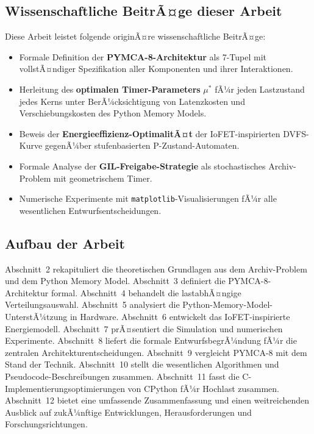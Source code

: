 ﻿\documentclass[a4paper,12pt]{scrreprt}
\theoremstyle{definition}
\begin{document}
	\subsection{Wissenschaftliche BeitrÃ¤ge dieser Arbeit}
	
	Diese Arbeit leistet folgende originÃ¤re wissenschaftliche BeitrÃ¤ge:
	
	\begin{itemize}[noitemsep]
		\item Formale Definition der \textbf{PYMCA-8-Architektur} als
		7-Tupel mit vollstÃ¤ndiger Spezifikation aller Komponenten und
		ihrer Interaktionen.
		\item Herleitung des \textbf{optimalen Timer-Parameters} $\mu^*$ fÃ¼r
		jeden Lastzustand jedes Kerns unter BerÃ¼cksichtigung von
		Latenzkosten und Verschiebungskosten des Python Memory Models.
		\item Beweis der \textbf{Energieeffizienz-OptimalitÃ¤t} der IoFET-inspirierten
		DVFS-Kurve gegenÃ¼ber stufenbasierten P-Zustand-Automaten.
		\item Formale Analyse der \textbf{GIL-Freigabe-Strategie} als
		stochastisches Archiv-Problem mit geometrischem Timer.
		\item Numerische Experimente mit \texttt{matplotlib}-Visualisierungen
		fÃ¼r alle wesentlichen Entwurfsentscheidungen.
	\end{itemize}
	
	\subsection{Aufbau der Arbeit}

	Abschnitt~2 rekapituliert die theoretischen Grundlagen aus dem Archiv-Problem und dem Python Memory Model.
	Abschnitt~3 definiert die PYMCA-8-Architektur formal.
	Abschnitt~4 behandelt die lastabhÃ¤ngige Verteilungsauswahl.
	Abschnitt~5 analysiert die Python-Memory-Model-UnterstÃ¼tzung in Hardware.
	Abschnitt~6 entwickelt das IoFET-inspirierte Energiemodell.
	Abschnitt~7 prÃ¤sentiert die Simulation und numerischen Experimente.
	Abschnitt~8 liefert die formale EntwurfsbegrÃ¼ndung fÃ¼r die zentralen Architekturentscheidungen.
	Abschnitt~9 vergleicht PYMCA-8 mit dem Stand der Technik.
	Abschnitt~10 stellt die wesentlichen Algorithmen und Pseudocode-Beschreibungen zusammen.
	Abschnitt~11 fasst die C-Implementierungsoptimierungen von CPython fÃ¼r Hochlast zusammen.
	Abschnitt~12 bietet eine umfassende Zusammenfassung und einen weitreichenden Ausblick auf zukÃ¼nftige Entwicklungen, Herausforderungen und Forschungsrichtungen.
	
\end{document}
